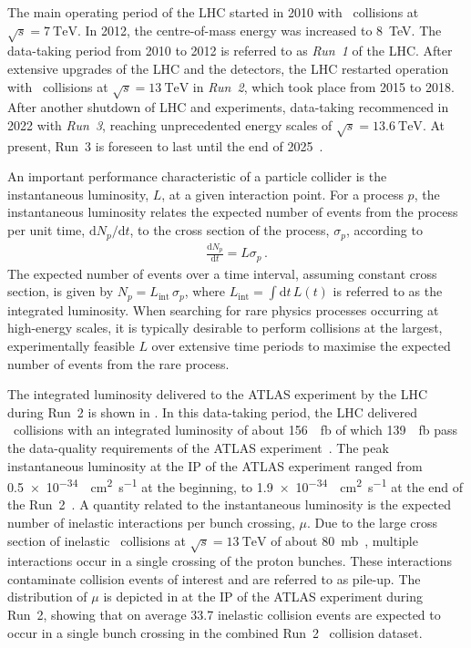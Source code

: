 The main operating period of the LHC started in 2010 with \pp~collisions at
$\sqrt{s} = \SI{7}{\TeV}$. In 2012, the centre-of-mass energy was increased to
\SI{8}{\TeV}. The data-taking period from 2010 to 2012 is referred to as
\emph{Run~1} of the LHC. After extensive upgrades of the LHC and the detectors,
the LHC restarted operation with \pp~collisions at $\sqrt{s} = \SI{13}{\TeV}$ in
\emph{Run~2}, which took place from 2015 to 2018. After another shutdown of LHC
and experiments, data-taking recommenced in 2022 with \emph{Run~3}, reaching
unprecedented energy scales of $\sqrt{s} = \SI{13.6}{\TeV}$. At present, Run~3
is foreseen to last until the end of 2025~\cite{lhc_schedule}.

An important performance characteristic of a particle collider is the
instantaneous luminosity, $L$, at a given interaction point. For a process $p$,
the instantaneous luminosity relates the expected number of events from the
process per unit time, $\mathrm{d}N_{p} / \mathrm{d}t$, to the cross section of
the process, $\sigma_{p}$, according to
\begin{align*}
  \frac{\mathrm{d}N_{p}}{\mathrm{d}t} = L \sigma_{p} \,\text{.}
\end{align*}
The expected number of events over a time interval, assuming constant
cross section, is given by $N_{p} = L_{\text{int}} \, \sigma_{p}$, where
$L_{\text{int}} = \int \mathrm{d}t \, L(t)$ is referred to as the integrated
luminosity. When searching for rare physics processes occurring at high-energy
scales, it is typically desirable to perform collisions at the largest,
experimentally feasible $L$ over extensive time periods to maximise the expected
number of events from the rare process.

The integrated luminosity delivered to the ATLAS experiment by the LHC during
Run~2 is shown in . In this data-taking period,
the LHC delivered \pp~collisions with an integrated luminosity of about
\SI{156}{\per\femto\barn} of which \SI{139}{\per\femto\barn} pass the
data-quality requirements of the ATLAS experiment~\cite{ATLAS-CONF-2019-021}.
The peak instantaneous luminosity at the IP of the ATLAS experiment ranged from
\SI{0.5e-34}{\per\centi\metre\squared\per\second} at the beginning, to
\SI{1.9e-34}{\per\centi\metre\squared\per\second} at the end of the
Run~2~\cite{ATLAS-CONF-2019-021}. A quantity related to the instantaneous
luminosity is the expected number of inelastic \pp interactions per bunch
crossing, $\mu$. Due to the large cross section of inelastic \pp~collisions at
$\sqrt{s} = \SI{13}{\TeV}$ of about \SI{80}{\milli\barn}~\cite{STDM-2015-05},
multiple interactions occur in a single crossing of the proton bunches. These
interactions contaminate collision events of interest and are referred to as
pile-up. The distribution of $\mu$ is depicted in  at the IP
of the ATLAS experiment during Run~2, showing that on average \num{33.7}
inelastic collision events are expected to occur in a single bunch crossing in
the combined Run~2 \pp~collision dataset.

